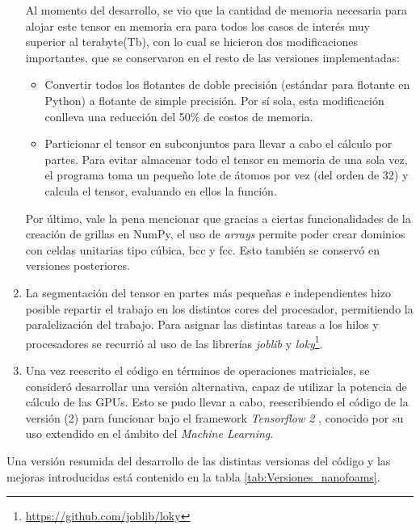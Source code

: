 \documentclass{article}
\begin{document}
\begin{enumerate}
    Al momento del desarrollo, se vio que la cantidad de memoria necesaria para alojar este tensor en memoria era para todos los casos de interés muy superior al terabyte(Tb), con lo cual se hicieron dos modificaciones importantes, que se conservaron en el resto de las versiones implementadas: 
    \begin{itemize}
        \item Convertir todos los flotantes de doble precisión (estándar para flotante en Python) a flotante de simple precisión. Por sí sola, esta modificación conlleva una reducción del 50\% de costos de memoria. 
        \item Particionar el tensor en subconjuntos para llevar a cabo el cálculo por partes. Para evitar almacenar todo el tensor en memoria de una sola vez, el programa toma un pequeño lote de átomos por vez (del orden de 32) y calcula el tensor, evaluando en ellos la función. 
    \end{itemize}
    Por último, vale la pena mencionar que gracias a ciertas funcionalidades de la creación de grillas en NumPy, el uso de \textit{arrays} permite poder crear dominios con celdas unitarias tipo cúbica, bcc y fcc. Esto también se conservó en versiones posteriores.
    \item La segmentación del tensor en partes más pequeñas e independientes hizo posible repartir el trabajo en los distintos cores del procesador, permitiendo la paralelización del trabajo. Para asignar las distintas tareas a los hilos y procesadores se recurrió al uso de las librerías \textit{joblib} y \textit{loky}\footnote{\url{https://github.com/joblib/loky}}. 
    \item Una vez reescrito el código en términos de operaciones matriciales, se consideró desarrollar una versión alternativa, capaz de utilizar la potencia de cálculo de las GPUs. Esto se pudo llevar a cabo, reescribiendo el código de la versión (2) para funcionar bajo el framework \textit{Tensorflow 2} \cite{tang2016tf}, conocido por su uso extendido en el ámbito del \textit{Machine Learning}. 
\end{enumerate}

Una versión resumida del desarrollo de las distintas versionas del código y las mejoras introducidas está contenido en la tabla \ref{tab:Versiones_nanofoams}.
\end{document}
